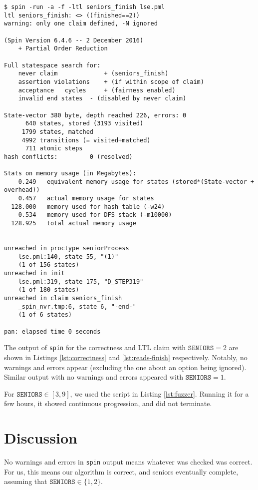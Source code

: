 \documentclass[a4paper]{scrartcl}
\begin{document}
\begin{lstlisting}[float, caption = {\texttt{spin} output for checking the LTL claim \texttt{seniors\_finish} with \(\texttt{SENIORS} = 2\)}, label = lst:reads-finish]
$ spin -run -a -f -ltl seniors_finish lse.pml
ltl seniors_finish: <> ((finished==2))
warning: only one claim defined, -N ignored

(Spin Version 6.4.6 -- 2 December 2016)
	+ Partial Order Reduction

Full statespace search for:
	never claim         	+ (seniors_finish)
	assertion violations	+ (if within scope of claim)
	acceptance   cycles 	+ (fairness enabled)
	invalid end states	- (disabled by never claim)

State-vector 380 byte, depth reached 226, errors: 0
      640 states, stored (3193 visited)
     1799 states, matched
     4992 transitions (= visited+matched)
      711 atomic steps
hash conflicts:         0 (resolved)

Stats on memory usage (in Megabytes):
    0.249	equivalent memory usage for states (stored*(State-vector + overhead))
    0.457	actual memory usage for states
  128.000	memory used for hash table (-w24)
    0.534	memory used for DFS stack (-m10000)
  128.925	total actual memory usage


unreached in proctype seniorProcess
	lse.pml:140, state 55, "(1)"
	(1 of 156 states)
unreached in init
	lse.pml:319, state 175, "D_STEP319"
	(1 of 180 states)
unreached in claim seniors_finish
	_spin_nvr.tmp:6, state 6, "-end-"
	(1 of 6 states)

pan: elapsed time 0 seconds
\end{lstlisting}

The output of \texttt{spin} for the correctness and LTL claim with \(\texttt{SENIORS} = 2\) are shown in Listings \ref{lst:correctness} and \ref{lst:reads-finish} respectively. Notably, no warnings and errors appear (excluding the one about an option being ignored). Similar output with no warnings and errors appeared with \(\texttt{SENIORS} = 1\).

For \(\texttt{SENIORS} \in [3, 9]\), we used the script in Listing \ref{lst:fuzzer}. Running it for a few hours, it showed continuous progression, and did not terminate.

\section{Discussion}
No warnings and errors in \texttt{spin} output means whatever was checked was correct. For us, this means our algorithm is correct, and seniors eventually complete, assuming that \(\texttt{SENIORS} \in \{1, 2\}\).
\end{document}
